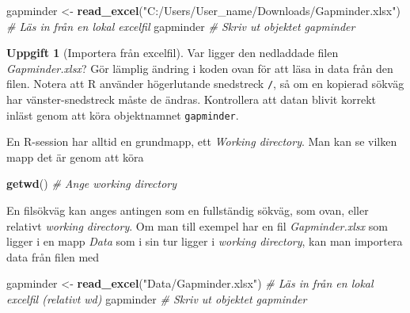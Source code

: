 \documentclass[
]{book}
\newenvironment{Shaded}{\begin{snugshade}}{\end{snugshade}}
\newcommand{\CommentTok}[1]{\textcolor[rgb]{0.56,0.35,0.01}{\textit{#1}}}
\newcommand{\FunctionTok}[1]{\textcolor[rgb]{0.13,0.29,0.53}{\textbf{#1}}}
\newcommand{\NormalTok}[1]{#1}
\newcommand{\OtherTok}[1]{\textcolor[rgb]{0.56,0.35,0.01}{#1}}
\newcommand{\StringTok}[1]{\textcolor[rgb]{0.31,0.60,0.02}{#1}}
\theoremstyle{definition}
\theoremstyle{definition}
\theoremstyle{definition}
\newtheorem{exercise}{Uppgift}[chapter]
\theoremstyle{definition}
\theoremstyle{remark}
\begin{document}
\begin{Shaded}
\begin{Highlighting}[]
\NormalTok{gapminder }\OtherTok{\textless{}{-}} \FunctionTok{read\_excel}\NormalTok{(}\StringTok{"C:/Users/User\_name/Downloads/Gapminder.xlsx"}\NormalTok{)    }\CommentTok{\# Läs in från en lokal excelfil}
\NormalTok{gapminder                                                                 }\CommentTok{\# Skriv ut objektet gapminder}
\end{Highlighting}
\end{Shaded}

\begin{exercise}[Importera från excelfil]
Var ligger den nedladdade filen \emph{Gapminder.xlsx}? Gör lämplig ändring i koden ovan för att läsa in data från den filen. Notera att R använder högerlutande snedstreck \texttt{/}, så om en kopierad sökväg har vänster-snedstreck måste de ändras. Kontrollera att datan blivit korrekt inläst genom att köra objektnamnet \texttt{gapminder}.
\end{exercise}

En R-session har alltid en grundmapp, ett \emph{Working directory}. Man kan se vilken mapp det är genom att köra

\begin{Shaded}
\begin{Highlighting}[]
\FunctionTok{getwd}\NormalTok{()                                }\CommentTok{\# Ange working directory}
\end{Highlighting}
\end{Shaded}

En filsökväg kan anges antingen som en fullständig sökväg, som ovan, eller relativt \emph{working directory}. Om man till exempel har en fil \emph{Gapminder.xlsx} som ligger i en mapp \emph{Data} som i sin tur ligger i \emph{working directory}, kan man importera data från filen med

\begin{Shaded}
\begin{Highlighting}[]
\NormalTok{gapminder }\OtherTok{\textless{}{-}} \FunctionTok{read\_excel}\NormalTok{(}\StringTok{"Data/Gapminder.xlsx"}\NormalTok{)             }\CommentTok{\# Läs in från en lokal excelfil (relativt wd)}
\NormalTok{gapminder                                                  }\CommentTok{\# Skriv ut objektet gapminder}
\end{Highlighting}
\end{Shaded}
\end{document}
